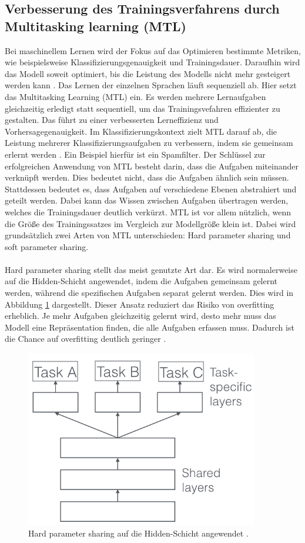 \subsection{Verbesserung des Trainingsverfahrens durch Multitasking learning (MTL)}
 Bei maschinellem Lernen wird der Fokus auf das Optimieren bestimmte Metriken, wie beispielsweise Klassifizierungsgenauigkeit und Trainingsdauer. Daraufhin wird das Modell soweit optimiert, bis die Leistung des Modells nicht mehr gesteigert werden kann \cite{Ruder.2017}. Das Lernen der einzelnen Sprachen läuft sequenziell ab. Hier setzt das Multitasking Learning (MTL) ein. Es werden mehrere Lernaufgaben gleichzeitig erledigt statt sequentiell, um das Trainingsvefahren effizienter zu gestalten. Das führt zu einer verbesserten Lerneffizienz und Vorhersagegenauigkeit. Im Klassifizierungskontext zielt MTL darauf ab, die Leistung mehrerer Klassifizierungsaufgaben zu verbessern, indem sie gemeinsam erlernt werden \cite{Lu_multitasklearning}. Ein Beispiel hierfür ist ein Spamfilter. Der Schlüssel zur erfolgreichen Anwendung von MTL besteht darin, dass die Aufgaben miteinander verknüpft werden. Dies bedeutet nicht, dass die Aufgaben ähnlich sein müssen. Stattdessen bedeutet es, dass Aufgaben auf verschiedene Ebenen abstrahiert und geteilt werden. Dabei kann das Wissen zwischen Aufgaben  übertragen werden, welches die Trainingsdauer deutlich verkürzt. MTL ist vor allem nützlich, wenn die Größe des Trainingssatzes im Vergleich zur Modellgröße klein ist. Dabei wird grundsätzlich zwei Arten von MTL unterschieden: Hard parameter sharing und soft parameter sharing. \\ \\ Hard parameter sharing stellt das meist genutzte Art dar\cite{Ruder.2017}. Es wird normalerweise auf die Hidden-Schicht angewendet, indem die Aufgaben gemeinsam gelernt werden, während die spezifischen Aufgaben separat gelernt werden. Dies wird in Abbildung \ref{fig:hard} dargestellt. Dieser Ansatz reduziert das Risiko von overfitting erheblich. Je mehr Aufgaben gleichzeitig gelernt wird, desto mehr muss das Modell eine Repräsentation finden, die alle Aufgaben erfassen muss. Dadurch ist die Chance auf overfitting deutlich geringer \cite{Ruder.2017} \cite{Lu_multitasklearning}.
  \begin{figure}[h!]
 	\centering
 	\includegraphics[width=0.8\linewidth]{images/hard}
 	\caption{Hard parameter sharing auf die Hidden-Schicht angewendet \cite{Kulbear.2017}.} %
 	\label{fig:hard}
 \end{figure}

